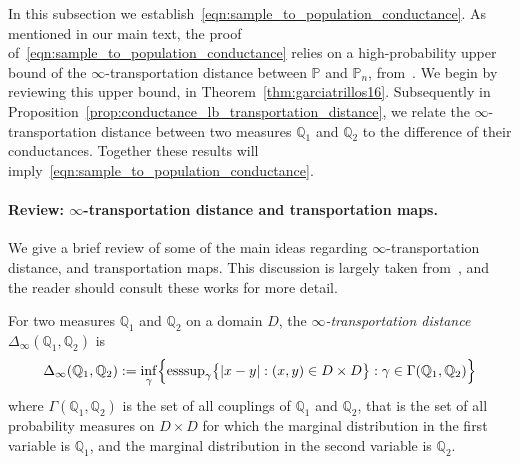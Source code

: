 \documentclass{article}
\newcommand{\1}{\mathbf{1}}
\newcommand{\mbb}[1]{\mathbb{#1}}
\theoremstyle{definition}
\theoremstyle{remark}
\begin{document}
In this subsection we establish~\eqref{eqn:sample_to_population_conductance}. As mentioned in our main text, the proof of~\eqref{eqn:sample_to_population_conductance} relies on a high-probability upper bound of the $\infty$-transportation distance between $\mbb{P}$ and $\mbb{P}_n$, from~\citep{garciatrillos16b}. We begin by reviewing this upper bound, in Theorem~\ref{thm:garciatrillos16}. Subsequently in Proposition~\ref{prop:conductance_lb_transportation_distance}, we relate the $\infty$-transportation distance between two measures $\mbb{Q}_1$ and $\mbb{Q}_2$ to the difference of their conductances. Together these results will imply~\eqref{eqn:sample_to_population_conductance}.

\paragraph{Review: $\infty$-transportation distance and transportation maps.}
We give a brief review of some of the main ideas regarding $\infty$-transportation distance, and transportation maps. This discussion is largely taken from~\citep{garciatrillos16b,garciatrillos16}, and the reader should consult these works for more detail. 

For two measures $\mbb{Q}_1$ and $\mbb{Q}_2$ on a domain $D$, the \emph{$\infty$-transportation distance} $\Delta_{\infty}(\mbb{Q}_1,\mbb{Q}_2)$ is
\begin{equation*}
\Delta_{\infty}(\mbb{Q}_1,\mbb{Q}_2) := \inf_{\gamma}\Bigl\{\mathrm{esssup}_{\gamma} \bigl\{|x - y|: (x,y) \in D \times D\bigr\}: \gamma \in \Gamma(\mbb{Q}_1,\mbb{Q}_2) \Bigr\}
\end{equation*}
where $\Gamma(\mbb{Q}_1,\mbb{Q}_2)$ is the set of all couplings of $\mbb{Q}_1$ and $\mbb{Q}_2$, that is the set of all probability measures on $D \times D$ for which the marginal distribution in the first variable is $\mbb{Q}_1$, and the marginal distribution in the second variable is $\mbb{Q}_2$. 
\end{document}
